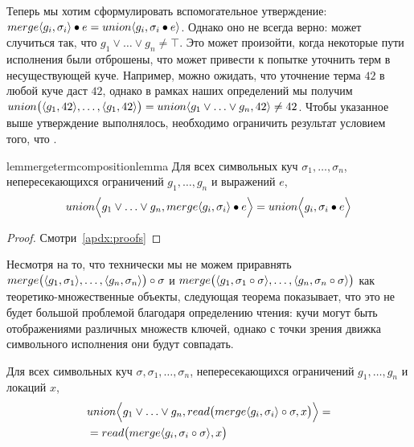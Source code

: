 %
Теперь мы хотим сформулировать вспомогательное утверждение: $merge\langle g_i, \sigma_i\rangle\bullet e=union\langle g_i, \sigma_i\bullet e\rangle$. Однако оно не всегда верно: может случиться так, что $g_1\vee\ldots\vee g_n \neq \top$. Это может произойти, когда некоторые пути исполнения были отброшены, что может привести к попытке уточнить терм в несуществующей куче. Например, можно ожидать, что уточнение терма $42$ в любой куче даст $42$, однако в рамках наших определений мы получим $union\big(\langle g_1, 42\rangle,\ldots,\langle g_1, 42\rangle\big)=union\langle g_1\vee\ldots\vee g_n, 42\rangle\neq 42$. Чтобы указанное выше утверждение выполнялось, необходимо ограничить результат условием того, что .
%
\begin{restatable}{lem}{mergetermcompositionlemma}\label{thm:merge-term-composition}
Для всех символьных куч $\sigma_1,\ldots,\sigma_n$, непересекающихся ограничений $g_1,\ldots,g_n$ и выражений $e$,
\begin{align*}
union\Big\langle g_1\vee\ldots\vee g_n, merge\langle g_i, \sigma_i\rangle\bullet e\Big\rangle=union\Big\langle g_i, \sigma_i\bullet e\Big\rangle
\end{align*}
\end{restatable}
\begin{proof}
Смотри~\autoref{apdx:proofs}
\end{proof}
%
Несмотря на то, что технически мы не можем приравнять $merge\big(\langle g_1, \sigma_1\rangle,\ldots,\langle g_n, \sigma_n\rangle\big)\circ\sigma$ и $merge\big(\langle g_1, \sigma_1\circ\sigma\rangle,\ldots,\langle g_n, \sigma_n\circ\sigma\rangle\big)$ как теоретико-множественные объекты, следующая теорема показывает, что это не будет большой проблемой благодаря определению чтения:  кучи могут быть отображениями различных множеств ключей, однако с точки зрения движка символьного исполнения они будут совпадать.
%
\begin{thm}\label{thm:merge-left-compose}
Для всех символьных куч $\sigma,\sigma_1,\ldots,\sigma_n$, непересекающихся ограничений $g_1,\ldots,g_n$ и локаций $x$,
\begin{align*}
&union\Big\langle g_1\vee\ldots\vee g_n, read\big(merge{\langle g_i, \sigma_i\rangle}\circ\sigma,x\big)\Big\rangle=\\
&=read\big(merge{\langle g_i, \sigma_i\circ\sigma\rangle},x\big)
\end{align*}
\end{thm}
